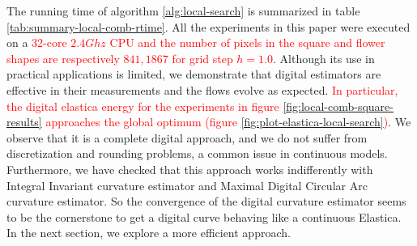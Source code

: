 \documentclass[smallextended]{svjour3}       %
\newcommand{\revision}[1]{\textcolor{red}{#1}}
\begin{document}
The running time of algorithm \ref{alg:local-search} is summarized in table \ref{tab:summary-local-comb-rtime}. All the
experiments in this paper were executed on a \revision{$32$-core $2.4Ghz$ CPU and the number of pixels in the square and
flower shapes are respectively $841,1867$ for grid step $h=1.0$}. Although its use in practical applications is
limited, we demonstrate that digital estimators are effective in their measurements and the flows evolve as expected. \revision{In particular, the digital elastica energy for the experiments in figure \ref{fig:local-comb-square-results} approaches the global optimum (figure  \ref{fig:plot-elastica-local-search})}. We
observe that it is a complete digital approach, and we do not suffer from discretization and rounding problems, a common
issue in continuous models.  Furthermore, we have checked that this approach works indifferently with Integral Invariant
curvature estimator and Maximal Digital Circular Arc curvature estimator. So the convergence of the digital curvature
estimator seems to be the cornerstone to get a digital curve behaving like a continuous Elastica.  In the next section,
we explore a more efficient approach.
\end{document}
